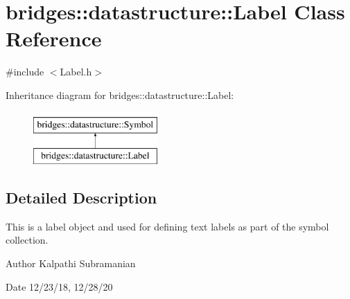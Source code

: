 \hypertarget{classbridges_1_1datastructure_1_1_label}{}\section{bridges\+:\+:datastructure\+:\+:Label Class Reference}
\label{classbridges_1_1datastructure_1_1_label}


{\ttfamily \#include $<$Label.\+h$>$}

Inheritance diagram for bridges\+:\+:datastructure\+:\+:Label\+:\begin{figure}[H]
\begin{center}
\leavevmode
\includegraphics[height=2.000000cm]{classbridges_1_1datastructure_1_1_label}
\end{center}
\end{figure}


\subsection{Detailed Description}
This is a label object and used for defining text labels as part of the symbol collection. 

\begin{DoxyAuthor}{Author}
Kalpathi Subramanian 
\end{DoxyAuthor}
\begin{DoxyDate}{Date}
12/23/18, 12/28/20 
\end{DoxyDate}
